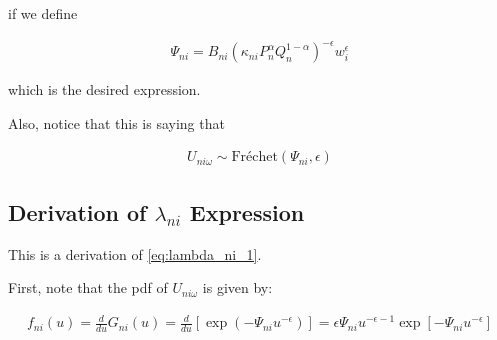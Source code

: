 \documentclass[10pt]{article}
\begin{document}
if we define

\begin{align}
    \Psi_{ni} = B_{n i} \left(\kappa_{n i} P_n^\alpha Q_n^{1-\alpha}\right)^{-\epsilon} w_i^\epsilon
\end{align}

which is the desired expression.

Also, notice that this is saying that

\begin{align}
    U_{n i \omega} \sim \text{Fréchet}\left(\Psi_{n i}, \epsilon\right) \label{eq:frechet_indirect_utility_sim}
\end{align}


\subsection{Derivation of $\lambda_{n i}$ Expression}
\label{sec:lambda_ni_1}

This is a derivation of \eqref{eq:lambda_ni_1}.

First, note that the pdf of $U_{n i \omega}$ is given by:

\begin{align}
    f_{n i}(u)=\frac{d}{d u} G_{n i}(u)= \frac{d}{d u}\left[\exp \left(-\Psi_{n i} u^{-\epsilon}\right)\right]
    =\epsilon \Psi_{n i} u^{-\epsilon-1} \exp \left[-\Psi_{n i} u^{-\epsilon}\right] \label{eq:pdf_frechet}
\end{align}
\end{document}
